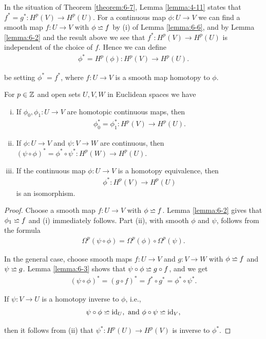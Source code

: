 In the situation of Theorem \ref{theorem:6-7}, Lemma \ref{lemma:4-11} states that 
$f^* = g^*: H^p(V)\to H^p(U)$. For a continuous map $\phi: U\to V$ we can find a smooth map 
$f:U\to V$ with $\phi\backsimeq f$ by (i) of Lemma \ref{lemma:6-6}, and by Lemma \ref{lemma:6-2} and the result 
above we see that $f^*: H^p(V)\to H^p(U)$ is independent of the choice of $f$. Hence we can define
\begin{align*}
  \phi^* = H^p(\phi): H^p(V)\to H^p(U).
\end{align*}

be setting $\phi^* = f^*$, where $f:U\to V$ is a smooth map homotopy to $\phi$.


\begin{theorem}\label{theorem:6-8}
For $p\in\mathbb{Z}$ and open sets $U, V, W$ in Euclidean spaces we have 
\begin{enumerate}[(i)]
  \item If $\phi_0, \phi_1:U\to V$ are homotopic continuous maps, then 
    \begin{align*}
      \phi_0^* = \phi_1^*: H^p(V)\to H^p(U).
    \end{align*}
  \item If $\phi:U\to V$ and $\psi:V\to W$ are continuous, then $(\psi\circ\phi)^* = \phi^*\circ\psi^*: H^p(W)\to H^p(U)$. 
  \item If the continuous map $\phi:U\to V$ is a homotopy equivalence, then 
    \begin{align*}
      \phi^*: H^p(V)\to H^p(U)
    \end{align*}
    is an isomorphism.
\end{enumerate}
\end{theorem}


\begin{proof}
Choose a smooth map $f:U\to V$ with $\phi\backsimeq f$. Lemma \ref{lemma:6-2} gives that
$\phi_1\backsimeq f$ and (i) immediately follows. Part (ii), with smooth $\phi$ and $\psi$, follows
from the formula
\begin{align*}
  \Omega^p(\psi\circ\phi) = \Omega^p(\phi)\circ\Omega^p(\psi).
\end{align*}

In the general case, choose smooth maps $f:U\to V$ and $g:V\to W$ with $\phi\backsimeq f$ and $\psi\backsimeq g$. Lemma \ref{lemma:6-3}
shows that $\psi\circ\phi\backsimeq g\circ f$, and we get 
\begin{align*}
  (\psi\circ\phi)^* = (g\circ f)^* = f^*\circ g^* = \phi^*\circ\psi^*.
\end{align*}

If $\psi:V\to U$ is a homotopy inverse to $\phi$, i.e.,
\begin{align*}
  \psi\circ\phi\backsimeq\operatorname{id}_U, \text{ and } \phi\circ\psi\backsimeq\operatorname{id}_V,
\end{align*}

then it follows from (ii) that $\psi^*:H^p(U)\to H^p(V)$ is inverse to $\phi^*$.
\end{proof}

